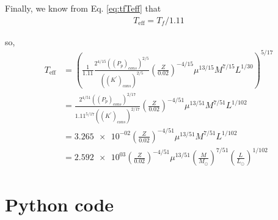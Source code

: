 Finally, we know from Eq. \ref{eq:tfTeff} that
\begin{align*}
    T_{\mathrm{eff}} = T_f/1.11
\end{align*}

so,
\begin{align*}
    T_{\mathrm{eff}} &= \left(\frac{1}{1.11}\frac{2^{4/15}((P_p)_{cons})^{2/5}}{((K^\prime)_{cons})^{2/5}}\left(\frac{Z}{0.02}\right)^{-4/15}\mu^{13/15}M^{7/15}L^{1/30}\right)^{5/17}\\
    &= \frac{2^{4/51}((P_p)_{cons})^{2/17}}{1.11^{5/17}((K^\prime)_{cons})^{2/17}}\left(\frac{Z}{0.02}\right)^{-4/51}\mu^{13/51}M^{7/51}L^{1/102}\\
    &= \num{3.265e-02}\left(\frac{Z}{0.02}\right)^{-4/51}\mu^{13/51}M^{7/51}L^{1/102}\\
    &= \num{2.592e+03}\left(\frac{Z}{0.02}\right)^{-4/51}\mu^{13/51}\left(\frac{M}{M_\odot}\right)^{7/51}\left(\frac{L}{L_\odot}\right)^{1/102}
\end{align*}



\appendix
\newpage

\section[]{Python code} 


